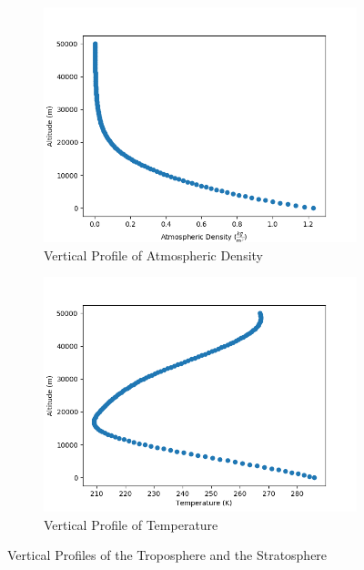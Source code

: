 \begin{figure}[H]
    \centering
    \begin{subfigure}{.44\textwidth}
        \centering
        \includegraphics[width=\textwidth]{Images/vertical_density_profile}
        \caption{Vertical Profile of Atmospheric Density}
        \label{density}
    \end{subfigure}
    \hfill
    \begin{subfigure}{.44\textwidth}
        \centering
        \includegraphics[width=\textwidth]{Images/vertical_temperature_profile.png}
        \caption{Vertical Profile of Temperature}
        \label{temp_profile}
    \end{subfigure}
    \caption{Vertical Profiles of the Troposphere and the Stratosphere}
\end{figure}

